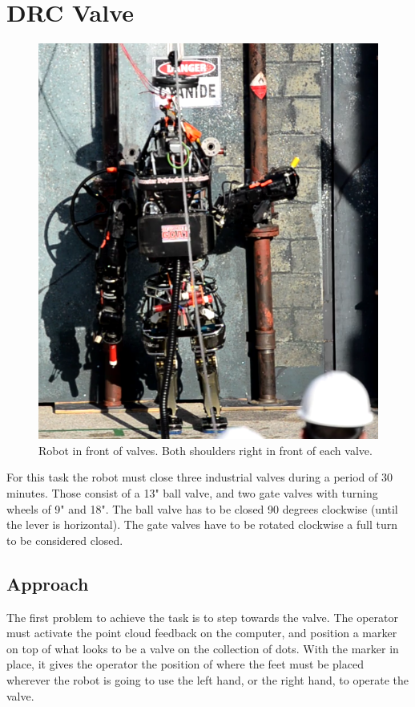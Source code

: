 \documentclass[12pt]{report}
\begin{document}
\section{DRC Valve}
\begin{figure}
  \begin{center}
    \includegraphics[scale=0.2]{images/turn_valve.png}
  \end{center}
  \caption{Robot in front of valves. Both shoulders right in front of each valve.}
\end{figure}
For this task the robot must close three industrial valves during a period of 30 minutes. Those consist of a 13" ball valve, and two gate valves with turning wheels of 9" and 18". The ball valve has to be closed 90 degrees clockwise (until the lever is horizontal). The gate valves have to be rotated clockwise a full turn to be considered closed.  \cite{valvetask}

\subsection{Approach}
The first problem to achieve the task is to step towards the valve. The operator must activate the point cloud feedback on the computer, and position a marker on top of what looks to be a valve on the collection of dots. With the marker in place, it gives the operator the position of where the feet must be placed wherever the robot is going to use the left hand, or the right hand, to operate the valve. 
\end{document}
